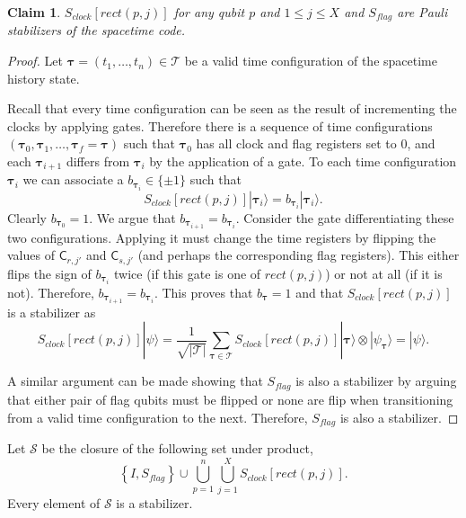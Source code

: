 \documentclass[11pt,letterpaper]{article}
\newtheorem{claim}[theorem]{Claim}
\theoremstyle{definition}
\theoremstyle{remark}
\newcommand{\cS}{\mathcal S}
\newcommand{\cT}{\mathcal T}
\renewcommand{\leq}{\leqslant}
\numberwithin{equation}{section}
\theoremstyle{definition}
\newcommand{\ket}[1]{|#1\rangle}
\newcommand{\sC}{{\mathsf{C}}}
\newcommand{\timeconfig}{{\bm{\tau}}}
\begin{document}
\begin{claim}
\label{clm:pauli_stabilizers}
  $S_{clock}[rect(p,j)]$ for any qubit $p$ and $1 \leq j \leq X$ and $S_{flag}$ are Pauli stabilizers of the spacetime code.
\end{claim}
\begin{proof}
Let $\timeconfig = (t_1,\ldots,t_n) \in \cT$ be a valid time configuration of the spacetime history state.
%

Recall that every time configuration can be seen as the result of incrementing the clocks by applying gates. Therefore there is a sequence of time configurations $(\timeconfig_0, \timeconfig_1, \ldots, \timeconfig_f = \timeconfig)$ such that $\timeconfig_0$ has all clock and flag registers set to 0, and each $\timeconfig_{i+1}$ differs from $\timeconfig_i$ by the application of a gate. To each time configuration $\timeconfig_i$ we can associate a $b_{\timeconfig_i} \in \{\pm 1\}$ such that 
\begin{equation}
S_{clock}[rect(p,j)] \ket{\timeconfig_i} = b_{\timeconfig_i} \ket{\timeconfig_i}.
\end{equation}
Clearly $b_{\timeconfig_0} = 1$. We argue that $b_{\timeconfig_{i+1}} = b_{\timeconfig_i}$. Consider the gate differentiating these two configurations. Applying it must change the time registers by flipping the values of $\sC_{r,j'}$ and $\sC_{s,j'}$ (and perhaps the corresponding flag registers). This either flips the sign of $b_{\timeconfig_{i}}$ twice (if this gate is one of $rect(p,j)$) or not at all (if it is not). Therefore, $b_{\timeconfig_{i+1}} = b_{\timeconfig_i}$. This proves that $b_{\timeconfig} = 1$ and that $S_{clock}[rect(p,j)]$ is a stabilizer as
\begin{equation}
  S_{clock}[rect(p,j)] \ket{\psi} = \frac{1}{\sqrt{|\cT|}} \sum_{\timeconfig \in \cT} S_{clock}[rect(p,j)] \ket{\timeconfig} \otimes \ket{\psi_\timeconfig} = \ket{\psi}.
\end{equation}

%
%
%
%
%

%
%
%
%
%

A similar argument can be made showing that $S_{flag}$ is also a stabilizer by arguing that either pair of flag qubits must be flipped or none are flip when transitioning from a valid time configuration to the next. Therefore, $S_{flag}$ is also a stabilizer.

%
\end{proof}

Let $\cS$ be the closure of the following set under product,
\begin{equation}
\left\{I, S_{flag} \right\} \cup \bigcup_{p = 1}^n \bigcup_{j = 1}^X S_{clock}[rect(p,j)].
\end{equation}
Every element of $\cS$ is a stabilizer.
\end{document}
